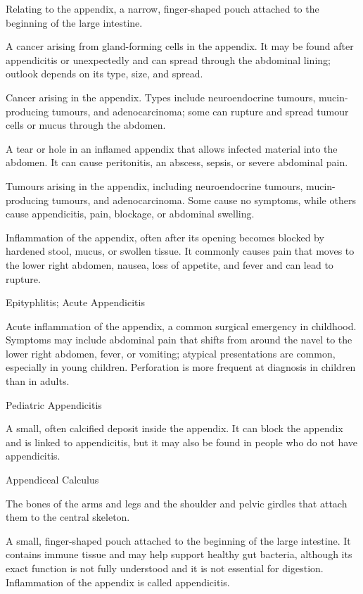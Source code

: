  Relating to the appendix, a narrow, finger-shaped pouch attached to the beginning of the large intestine.

 A cancer arising from gland-forming cells in the appendix. It may be found after appendicitis or unexpectedly and can spread through the abdominal lining; outlook depends on its type, size, and spread.

 Cancer arising in the appendix. Types include neuroendocrine tumours, mucin-producing tumours, and adenocarcinoma; some can rupture and spread tumour cells or mucus through the abdomen.

 A tear or hole in an inflamed appendix that allows infected material into the abdomen. It can cause peritonitis, an abscess, sepsis, or severe abdominal pain.

 Tumours arising in the appendix, including neuroendocrine tumours, mucin-producing tumours, and adenocarcinoma. Some cause no symptoms, while others cause appendicitis, pain, blockage, or abdominal swelling.

 Inflammation of the appendix, often after its opening becomes blocked by hardened stool, mucus, or swollen tissue. It commonly causes pain that moves to the lower right abdomen, nausea, loss of appetite, and fever and can lead to rupture.

\synonyms
Epityphlitis; Acute Appendicitis

 Acute inflammation of the appendix, a
common surgical emergency in childhood. Symptoms may include abdominal pain
that shifts from around the navel to the lower right abdomen, fever, or
vomiting; atypical presentations are common, especially in young children.
Perforation is more frequent at diagnosis in children than in adults.

\synonyms
Pediatric Appendicitis

 A small, often calcified deposit inside the appendix.
It can block the appendix and is linked to appendicitis, but it may also be
found in people who do not have appendicitis.

\synonyms
Appendiceal Calculus

 The bones of the arms and legs and the shoulder and pelvic girdles that attach them to the central skeleton.

 A small, finger-shaped pouch attached to the beginning of the large intestine. It contains immune tissue and may help support healthy gut bacteria, although its exact function is not fully understood and it is not essential for digestion. Inflammation of the appendix is called appendicitis.

